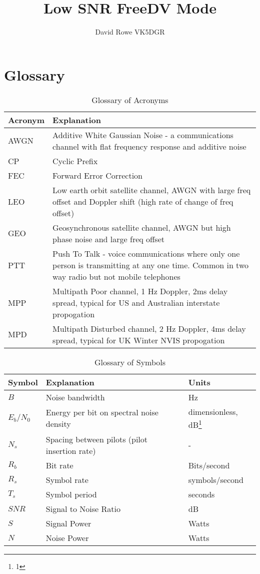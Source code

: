 \documentclass{article}
\begin{document}
\title{Low SNR FreeDV Mode}
\author{David Rowe VK5DGR}
\maketitle

\section{Glossary}

\begin{table}[h]
\centering
\begin{tabular}{l p{8cm} }
 \hline
 Acronym & Explanation \\
 \hline
 AWGN & Additive White Gaussian Noise - a communications channel with flat frequency response and additive noise \\
 CP & Cyclic Prefix \\
 FEC & Forward Error Correction \\
 LEO & Low earth orbit satellite channel, AWGN with large freq offset and Doppler shift (high rate of change of freq offset) \\
 GEO & Geosynchronous satellite channel, AWGN but high phase noise and large freq offset \\
 PTT & Push To Talk - voice communications where only one person is transmitting at any one time.  Common in two way radio but not mobile telephones  \\
 MPP & Multipath Poor channel, 1 Hz Doppler, 2ms delay spread, typical for US and Australian interstate propogation \\
 MPD & Multipath Disturbed channel, 2 Hz Doppler, 4ms delay spread, typical for UK Winter NVIS propogation \\
 \hline
\end{tabular}
\caption{Glossary of Acronyms}
\end{table}

\begin{table}[h]
\centering
\begin{tabular}{l l l}
 \hline
 Symbol & Explanation & Units \\
 \hline
 $B$ & Noise bandwidth & Hz \\
 $E_b/N_0$ & Energy per bit on spectral noise density & dimensionless, dB\footnote{1} \\
 $N_s$ & Spacing between pilots (pilot insertion rate) & - \\
 $R_b$ & Bit rate & Bits/second \\
 $R_s$ & Symbol rate & symbols/second \\
 $T_s$ & Symbol period & seconds \\
 $SNR$ & Signal to Noise Ratio & dB \\
 $S$ & Signal Power & Watts \\
 $N$ & Noise Power & Watts \\
 \hline
\end{tabular}
\caption{Glossary of Symbols}
\end{table}
\end{document}
